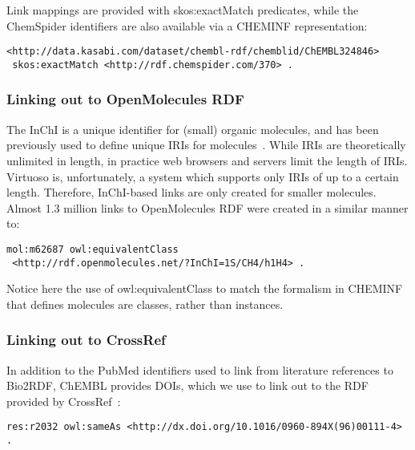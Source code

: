 \documentclass[sw]{iosart2c}
\begin{document}
Link mappings are provided with skos:exactMatch predicates, while the ChemSpider identifiers
are also available via a CHEMINF representation:
 
\begin{tiny}
\begin{verbatim}
<http://data.kasabi.com/dataset/chembl-rdf/chemblid/ChEMBL324846>
 skos:exactMatch <http://rdf.chemspider.com/370> .
\end{verbatim}
\end{tiny}

\subsubsection{Linking out to OpenMolecules RDF}

The InChI is a unique identifier for (small) organic molecules, and has been previously used
to define unique IRIs for molecules~\cite{Bradley2009,Willighagen2011}. While IRIs are theoretically unlimited in length,
in practice web browsers and servers limit the length of IRIs. Virtuoso is, unfortunately,
a system which supports only IRIs of up to a certain length. Therefore, InChI-based links are only created for smaller molecules. 
Almost 1.3 million links to OpenMolecules RDF were created in a similar manner to:

\begin{tiny}
\begin{verbatim}
mol:m62687 owl:equivalentClass
 <http://rdf.openmolecules.net/?InChI=1S/CH4/h1H4> .
\end{verbatim}
\end{tiny}

Notice here the use of owl:equivalentClass to match the formalism in CHEMINF that defines molecules
are classes, rather than instances.

\subsubsection{Linking out to CrossRef}

In addition to the PubMed identifiers used to link from literature references to Bio2RDF,
ChEMBL provides DOIs, which we use to link out to the RDF provided by CrossRef~\citep{Bilder2011}:

\begin{tiny}
\begin{verbatim}
res:r2032 owl:sameAs <http://dx.doi.org/10.1016/0960-894X(96)00111-4> .
\end{verbatim}
\end{tiny}
\end{document}
